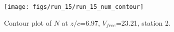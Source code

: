 \begin{figure}[H]
\centering
\texttt{[image: figs/run\_15/run\_15\_num\_contour]}
\caption{Contour plot of $N$ at $z/c$=6.97, $V_{free}$=23.21, station 2.}
\label{fig:run_15_num_contour}
\end{figure}


